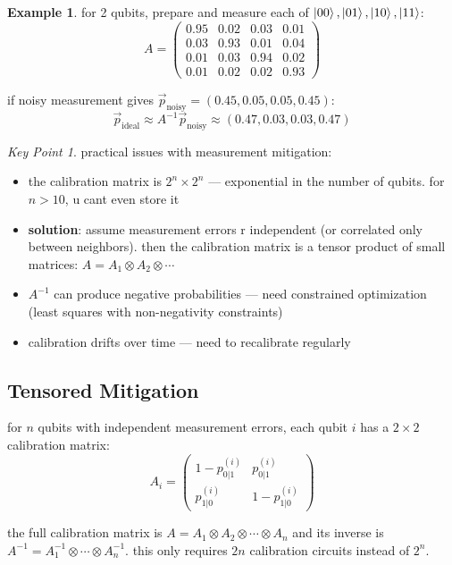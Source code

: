 \documentclass[11pt,a4paper]{article}
\theoremstyle{definition}
\newtheorem{example}{Example}[section]
\theoremstyle{remark}
\newtheorem*{keypoint}{Key Point}
\begin{document}
\begin{example}
for 2 qubits, prepare and measure each of $\ket{00}, \ket{01}, \ket{10}, \ket{11}$:
\[
A = \begin{pmatrix} 0.95 & 0.02 & 0.03 & 0.01 \\ 0.03 & 0.93 & 0.01 & 0.04 \\ 0.01 & 0.03 & 0.94 & 0.02 \\ 0.01 & 0.02 & 0.02 & 0.93 \end{pmatrix}
\]

if noisy measurement gives $\vec{p}_{\text{noisy}} = (0.45, 0.05, 0.05, 0.45)$:
\[
\vec{p}_{\text{ideal}} \approx A^{-1}\vec{p}_{\text{noisy}} \approx (0.47, 0.03, 0.03, 0.47)
\]
\end{example}

\begin{keypoint}
practical issues with measurement mitigation:
\begin{itemize}
    \item the calibration matrix is $2^n \times 2^n$ --- exponential in the number of qubits. for $n > 10$, u cant even store it
    \item \textbf{solution}: assume measurement errors r independent (or correlated only between neighbors). then the calibration matrix is a tensor product of small matrices: $A = A_1 \otimes A_2 \otimes \cdots$
    \item $A^{-1}$ can produce negative probabilities --- need constrained optimization (least squares with non-negativity constraints)
    \item calibration drifts over time --- need to recalibrate regularly
\end{itemize}
\end{keypoint}

\subsection{Tensored Mitigation}

for $n$ qubits with independent measurement errors, each qubit $i$ has a $2 \times 2$ calibration matrix:
\[
A_i = \begin{pmatrix} 1 - p_{0|1}^{(i)} & p_{0|1}^{(i)} \\ p_{1|0}^{(i)} & 1 - p_{1|0}^{(i)} \end{pmatrix}
\]

the full calibration matrix is $A = A_1 \otimes A_2 \otimes \cdots \otimes A_n$ and its inverse is $A^{-1} = A_1^{-1} \otimes \cdots \otimes A_n^{-1}$. this only requires $2n$ calibration circuits instead of $2^n$.
\end{document}
